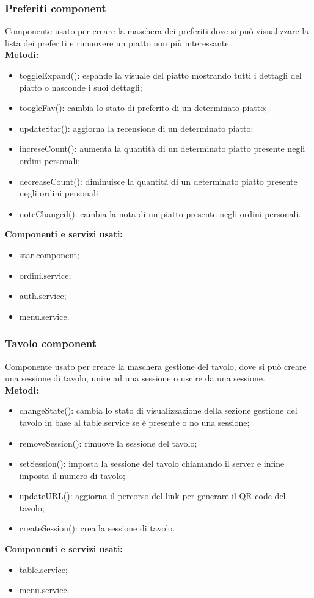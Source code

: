 \subsubsection{Preferiti component}
Componente usato per creare la maschera dei preferiti dove si può visualizzare la lista dei preferiti e rimuovere un piatto non più interessante.\\
\textbf{Metodi:}
\begin{itemize}
    \item toggleExpand(): espande la visuale del piatto mostrando tutti i dettagli del piatto o nasconde i suoi dettagli;
    \item toogleFav(): cambia lo stato di preferito di un determinato piatto;
    \item updateStar(): aggiorna la recensione di un determinato piatto;
    \item increseCount(): aumenta la quantità di un determinato piatto presente negli ordini personali;
    \item decreaseCount(): diminuisce la quantità di un determinato piatto presente negli ordini personali
    \item noteChanged(): cambia la nota di un piatto presente negli ordini personali.
\end{itemize}
\textbf{Componenti e servizi usati:}
\begin{itemize}
    \item star.component;
    \item ordini.service;
    \item auth.service;
    \item menu.service.
\end{itemize}

\subsubsection{Tavolo component}
Componente usato per creare la maschera gestione del tavolo, dove si può creare una sessione di tavolo, unire ad una sessione o uscire da una sessione.\\
\textbf{Metodi:}
\begin{itemize}
    \item changeState(): cambia lo stato di visualizzazione della sezione gestione del tavolo in base al table.service se è presente o no una sessione;
    \item removeSession(): rimuove la sessione del tavolo;
    \item setSession(): imposta la sessione del tavolo chiamando il server e infine imposta il numero di tavolo;
    \item updateURL(): aggiorna il percorso del link per generare il QR-code del tavolo;
    \item createSession(): crea la sessione di tavolo.
\end{itemize}
\textbf{Componenti e servizi usati:}
\begin{itemize}
    \item table.service;
    \item menu.service.
\end{itemize}

